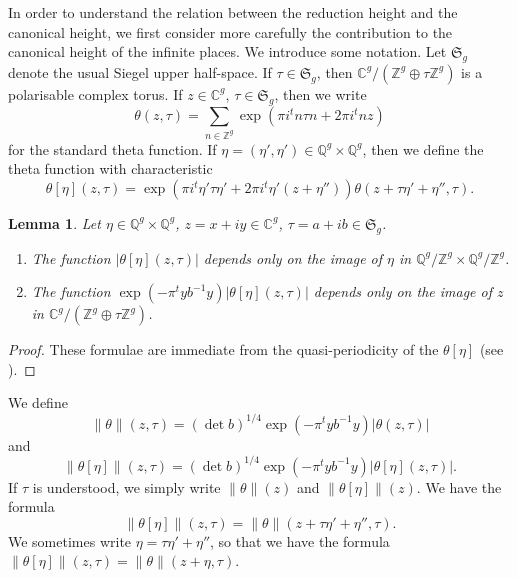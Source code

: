 \documentclass{article} %
\newtheorem{lemma}[proposition]{Lemma}
\numberwithin{equation}{section}
\newcommand{\Q}{\mathbb{Q}}
\newcommand{\bC}{\mathbb{C}}
\newcommand{\Z}{\mathbb{Z}}
\begin{document}
In order to understand the relation between the reduction height and the canonical height, we first consider more carefully the contribution to the canonical height of the infinite places. We introduce some notation. Let $\mathfrak{S}_g$ denote the usual Siegel upper half-space. If $\tau \in \mathfrak{S}_g$, then $\bC^g / (\Z^g \oplus \tau \Z^g)$ is a polarisable complex torus. If $z \in \bC^g$, $\tau \in \mathfrak{S}_g$, then we write 
\[ \theta(z, \tau) = \sum_{n \in \Z^g} \exp(\pi i {}^t n \tau n + 2 \pi i {}^t n z) \]
for the standard theta function. If $\eta = (\eta', \eta') \in \Q^g \times \Q^g$, then we define the theta function with characteristic
\[ \theta[\eta](z, \tau) = \exp(\pi i {}^t \eta' \tau \eta' + 2 \pi i {}^t \eta' (z + \eta'')) \theta(z + \tau \eta' + \eta'', \tau). \]
\begin{lemma} Let $\eta \in \Q^g \times \Q^g$, $z = x + i y \in \bC^g$, $\tau = a + i b \in \mathfrak{S}_g$.
    \begin{enumerate}
        \item The function $|\theta[\eta](z, \tau)|$ depends only on the image of $\eta$ in $\Q^g / \Z^g \times \Q^g / \Z^g$.
        \item The function $\exp(- \pi {}^t y b^{-1} y) |\theta[\eta](z, \tau)|$ depends only on the image of $z$ in $\bC^g / (\Z^g \oplus \tau \Z^g)$.
    \end{enumerate}
\end{lemma}
\begin{proof}
    These formulae are immediate from the quasi-periodicity of the $\theta[\eta]$ (see \cite[p. 123]{MumfordTataI}). 
\end{proof}
We define 
\[ \| \theta \|(z, \tau) = (\det b)^{1/4} \exp(- \pi {}^t y b^{-1} y) |\theta(z, \tau)| \]
and 
\[ \| \theta[\eta] \|(z, \tau) = (\det b)^{1/4} \exp(- \pi {}^t y b^{-1} y) |\theta[\eta](z, \tau)|. \]
If $\tau$ is understood, we simply write $\|\theta\|(z)$ and $\|\theta[\eta]\|(z)$.
We  have the formula
\[ \| \theta[\eta] \|(z, \tau) = \| \theta \| (z + \tau \eta' + \eta'', \tau). \]
We sometimes write $\eta = \tau\eta' + \eta''$, so that we have the formula $\|\theta[\eta]\|(z,\tau) = \|\theta\|(z + \eta, \tau)$.
\end{document}
